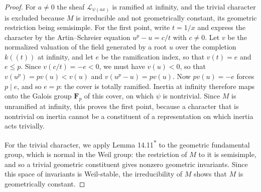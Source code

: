 \documentclass[11pt]{article}
\newcommand{\bpout}[1]{#1\textsuperscript{\hyperlink{bp-outside}{\ensuremath{\ast}}}}
\begin{document}
\begin{proof}[{Proof}]\label{bp56}%
For \(a\ne0\) the sheaf \(\mathcal L_{\psi(ax)}\) is ramified at infinity, and the trivial character is excluded because \(M\) is irreducible and not geometrically constant, its geometric restriction being semisimple. For the first point, write \(t=1/x\) and express the character by the Artin–Schreier equation \(u^p-u=c/t\) with \(c\ne0\). Let \(v\) be the normalized valuation of the field generated by a root \(u\) over the completion \(k((t))\) at infinity, and let \(e\) be the ramification index, so that \(v(t)=e\) and \(e\le p\). Since \(v(c/t)=-e<0\), we must have \(v(u)<0\), so that \(v(u^p)=pv(u)<v(u)\) and \(v(u^p-u)=pv(u)\). Now \(pv(u)=-e\) forces \(p\mid e\), and so \(e=p\): the cover is totally ramified. Inertia at infinity therefore maps onto the Galois group \(\mathbf F_p\) of this cover, on which \(\psi\) is nontrivial. Since \(M\) is unramified at infinity, this proves the first point, because a character that is nontrivial on inertia cannot be a constituent of a representation on which inertia acts trivially.

For the trivial character, we apply Lemma \bpout{14.11} to the geometric fundamental group, which is normal in the Weil group: the restriction of \(M\) to it is semisimple, and so a trivial geometric constituent gives nonzero geometric invariants. Since this space of invariants is Weil-stable, the irreducibility of \(M\) shows that \(M\) is geometrically constant.
\end{proof}



\clearpage{}\hypertarget{bp-outside}{}%
\end{document}
